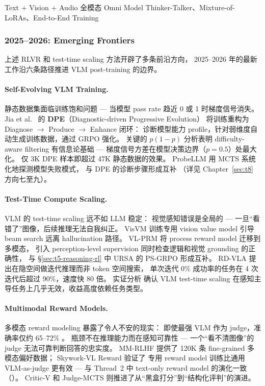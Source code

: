   {Text + Vision + Audio 全模态 Omni Model}
  {Thinker-Talker、Mixture-of-LoRAs、End-to-End Training}

\subsubsection{2025--2026: Emerging Frontiers}
\label{sec:t5-emerging}
\label{sec:t5-self-evolving}

上述 RLVR 和 test-time scaling 方法开辟了多条前沿方向，
2025--2026 年的最新工作沿六条路径推进 VLM post-training 的边界。

\paragraph{Self-Evolving VLM Training.}
静态数据集面临训练饱和问题 --- 当模型 pass rate 趋近 0 或 1 时梯度信号消失。
Jia et al.\ \cite{jia2026dpe} 的 \textbf{DPE}（Diagnostic-driven Progressive Evolution）
将训练重构为 Diagnose $\rightarrow$ Produce $\rightarrow$ Enhance 闭环：
诊断模型能力 profile，针对弱维度自动生成训练数据，通过 GRPO 强化。
关键的 $p(1-p)$ 分析表明 difficulty-aware filtering 有信息论基础 ---
梯度信号方差在模型决策边界（$p=0.5$）处最大化。
仅 3K DPE 样本即超过 47K 静态数据的效果。
ProbeLLM \cite{huang2026probellm} 用 MCTS 系统化地探测模型失败模式，
与 DPE 的诊断步骤形成互补
（详见 Chapter~\ref{sec:t8} 方向七至九）。

\paragraph{Test-Time Compute Scaling.}
\label{sec:t5-test-time-compute}
VLM 的 test-time scaling 远不如 LLM 稳定：
视觉感知错误是全局的 --- 一旦``看错了''图像，后续推理无法自我纠正。
VisVM \cite{wang2024visvm} 训练专用 vision value model 引导 beam search 远离 hallucination 路径。
VL-PRM \cite{ong2025vlprm} 将 process reward model 迁移到多模态，
引入 perception-level supervision 同时检查逻辑和视觉 grounding 的正确性，
与 \S\ref{sec:t5-reasoning-rl} 中 URSA 的 PS-GRPO 形成互补。
RD-VLA \cite{tur2026rdvla} 提出在隐空间做迭代推理而非 token 空间搜索，
单次迭代 0\% 成功率的任务在 4 次迭代后超过 90\%，速度快 80 倍。
实证分析 \cite{ahmadpour2025ttsvisonlanguage} 确认 VLM test-time scaling
在感知主导任务上几乎无效，收益高度依赖任务类型。

\paragraph{Multimodal Reward Models.}
\label{sec:t5-reward-models}
多模态 reward modeling 暴露了令人不安的现实：
即使最强 VLM 作为 judge，准确率仅约 65--72\%
\cite{li2024vlrewardbench,yasunaga2025mmrewardbench}。
瓶颈不在推理能力而在感知可靠性 ---
一个``看不清图像''的 judge 无法可靠判断回答的忠实度。
MM-RLHF \cite{zhang2025mmrlhf} 提供了 120K 条 fine-grained 多模态偏好数据；
Skywork-VL Reward \cite{wang2025skyworkvlreward} 验证了
专用 reward model 训练比通用 VLM-as-judge 更有效 ---
与 Thread~2 中 text-only reward model 的演化一致
（）。
Critic-V \cite{zhang2024criticv} 和 Judge-MCTS \cite{chen2026mjudgebench}
则推进了从``黑盒打分''到``结构化评判''的演进。

